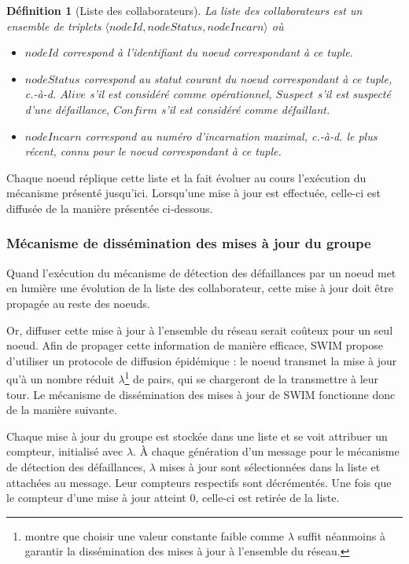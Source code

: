 \documentclass[12pt]{thesul}
\newtheorem{definition}{Définition}
\newcommand{\ie}{c.-à-d. }
\newcommand{\trm}[1]{\mathit{#1}}
\begin{document}
\begin{definition}[Liste des collaborateurs]
  \label{def:collaborator-list}
  La \emph{liste des collaborateurs} est un ensemble de triplets $\langle \trm{nodeId},\trm{nodeStatus},\trm{nodeIncarn} \rangle$ où
  \begin{itemize}
    \item $\trm{nodeId}$ correspond à l'identifiant du noeud correspondant à ce tuple.
    \item $\trm{nodeStatus}$ correspond au statut courant du noeud correspondant à ce tuple, \ie $\trm{Alive}$ s'il est considéré comme opérationnel, $\trm{Suspect}$ s'il est suspecté d'une défaillance, $\trm{Confirm}$ s'il est considéré comme défaillant.
    \item $\trm{nodeIncarn}$ correspond au numéro d'incarnation maximal, \ie le plus récent, connu pour le noeud correspondant à ce tuple.
  \end{itemize}
\end{definition}

Chaque noeud réplique cette liste et la fait évoluer au cours l'exécution du mécanisme présenté jusqu'ici.
Lorsqu'une mise à jour est effectuée, celle-ci est diffusée de la manière présentée ci-dessous.

\subsubsection{Mécanisme de dissémination des mises à jour du groupe}

\label{sec:swim-update-dissemination}

Quand l'exécution du mécanisme de détection des défaillances par un noeud met en lumière une évolution de la liste des collaborateur, cette mise à jour doit être propagée au reste des noeuds.

Or, diffuser cette mise à jour à l'ensemble du réseau serait coûteux pour un seul noeud.
Afin de propager cette information de manière efficace, SWIM propose d'utiliser un protocole de diffusion épidémique : le noeud transmet la mise à jour qu'à un nombre réduit $\lambda$\footnote{
  \cite{swim2002} montre que choisir une valeur constante faible comme $\lambda$ suffit néanmoins à garantir la dissémination des mises à jour à l'ensemble du réseau.
} de pairs, qui se chargeront de la transmettre à leur tour.
Le mécanisme de dissémination des mises à jour de SWIM fonctionne donc de la manière suivante.

Chaque mise à jour du groupe est stockée dans une liste et se voit attribuer un compteur, initialisé avec $\lambda$.
À chaque génération d'un message pour le mécanisme de détection des défaillances, $\lambda$ mises à jour sont sélectionnées dans la liste et attachées au message.
Leur compteurs respectifs sont décrémentés.
Une fois que le compteur d'une mise à jour atteint 0, celle-ci est retirée de la liste.
\end{document}
